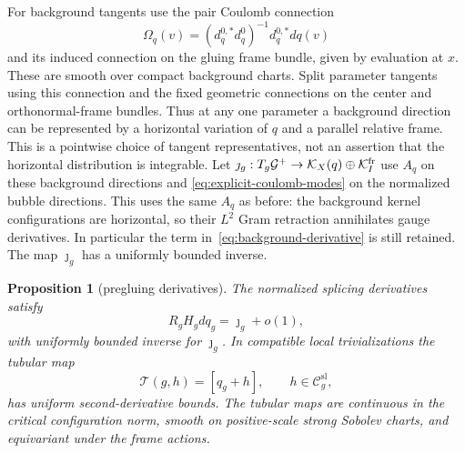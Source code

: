 \documentclass[11pt]{amsart}
\newtheorem{proposition}[theorem]{Proposition}
\theoremstyle{definition}
\theoremstyle{remark}
\theoremstyle{plain}
\newcommand{\cC}{\mathcal{C}}
\newcommand{\cG}{\mathcal{G}}
\newcommand{\cK}{\mathcal{K}}
\begin{document}
For background tangents use the pair Coulomb connection
\begin{equation}\label{eq:background-frame-connection}
 \Omega_q(v)=(d_q^{0,*}d_q^0)^{-1}d_q^{0,*}dq(v)
\end{equation}
and its induced connection on the gluing frame bundle, given by
evaluation at $x$.  These are smooth over compact background charts.
Split parameter tangents using this connection and the fixed geometric
connections on the center and orthonormal-frame bundles.  Thus at any
one parameter a background direction can be represented by a horizontal
variation of $q$ and a parallel relative frame.  This is a pointwise
choice of tangent representatives, not an assertion that the horizontal
distribution is integrable.
Let $\jmath_g:T_g\cG^+\to\cK_X(q)\oplus\cK_I^{\rm fr}$ use
$A_q$ on these background directions and
\eqref{eq:explicit-coulomb-modes} on the normalized bubble directions.
This uses the same $A_q$ as before: the background kernel configurations
are horizontal, so their $L^2$ Gram retraction annihilates gauge
derivatives.  In particular the term in~\eqref{eq:background-derivative}
is still retained.  The map $\jmath_g$ has a uniformly bounded inverse.

\begin{proposition}[pregluing derivatives]\label{prop:pregluing-modulation}
The normalized splicing derivatives satisfy
\begin{equation}\label{eq:parameter-retraction}
 R_gH_gdq_g=\jmath_g+o(1),
\end{equation}
with uniformly bounded inverse for $\jmath_g$.  In compatible local
trivializations the tubular map
\begin{equation}\label{eq:tubular-map}
 \mathcal T(g,h)=[q_g+h],\qquad h\in\cC_g^{\mathrm{sl}},
\end{equation}
has uniform second-derivative bounds.  The tubular maps are
continuous in the critical configuration norm, smooth on positive-scale
strong Sobolev charts, and equivariant under the frame actions.
\end{proposition}
\end{document}
